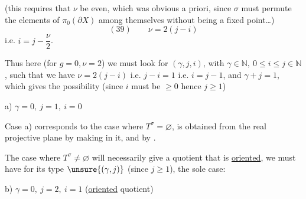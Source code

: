 

(this requires that $\nu$ be even, which was obvious a priori, since $\sigma$ must permute the elements of $\pi_0(\partial X)$ among themselves without  being a fixed point\ldots)
\[
(39)\qquad \nu=2(j-i)
\]
i.e. \uline{$i=j-\dfrac{\nu}{2}$}.

Thus here (for $g=0,\nu=2$) we must look for $(\gamma,j,i)$, with $\gamma\in\mathbb N,\ 0\leq i\leq j\in\mathbb N$, such that we have $\nu=2(j-i)$ i.e. $j-i=1$ i.e. $i=j-1$, and $\gamma+j=1$, which gives the  possibility (since $i$ must be $\geq0$ hence $j\geq1$)

a) $\gamma=0,\ j=1,\ i=0$ 


Case a) corresponds to the case where  $T^\sigma=\varnothing$,  is obtained from the real projective plane by making   in it,  and by . 

The case where $T^\sigma\neq\varnothing$ will necessarily give a quotient  that is \uline{oriented}, we must have for its type $\unsure{(\gamma,j)}$ (since $j\geq1$), the sole case:


b) $\gamma=0,\ j=2,\ i=1$ (\uline{oriented} quotient)

